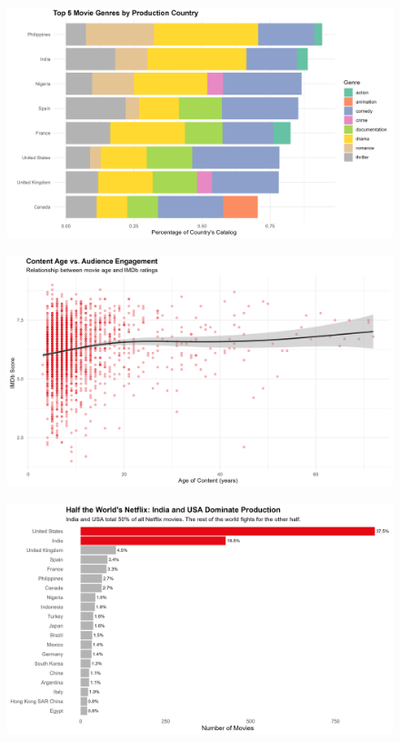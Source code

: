 \documentclass[
  man,floatsintext]{apa6}
\begin{document}
\begin{figure}

{\centering \includegraphics[width=0.9\linewidth]{../Question3/Results/top5movies} 

}

\caption{ }\label{fig:audienceengage-7}
\end{figure}
\begin{figure}

{\centering \includegraphics[width=0.9\linewidth]{../Question3/Results/viewership} 

}

\caption{ }\label{fig:audienceengage-8}
\end{figure}
\begin{figure}

{\centering \includegraphics[width=0.9\linewidth]{../Question3/Results/top20creators} 

}

\caption{ }\label{fig:audienceengage-9}
\end{figure}
\end{document}
